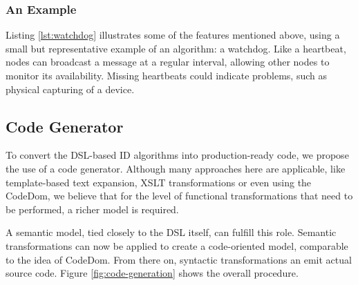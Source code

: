 \documentclass[conference]{IEEEtran}
\newcommand{\NAME}{id-foo\xspace}
\begin{document}
\subsubsection*{An Example}

Listing \ref{lst:watchdog} illustrates some of the features mentioned above,
using a small but representative example of an algorithm: a
watchdog\cite{mishra2004intrusion}. Like a heartbeat, nodes can broadcast a
message at a regular interval, allowing other nodes to monitor its
availability. Missing heartbeats could indicate problems, such as physical
capturing of a device.



\subsection{Code Generator}
\label{code-generator-design}

To convert the DSL-based ID algorithms into production-ready code, we propose
the use of a code generator. Although many approaches here are applicable, like
template-based text expansion, XSLT transformations or even using the
CodeDom\cite{dollard2004code}, we believe that for the level of functional
transformations that need to be performed, a richer model is required.

A semantic model\cite{fowler2010domain}, tied closely to the DSL itself, can
fulfill this role. Semantic transformations can now be applied to create a
code-oriented model, comparable to the idea of CodeDom. From there on,
syntactic transformations an emit actual source code. Figure
\ref{fig:code-generation} shows the overall procedure.
\end{document}
